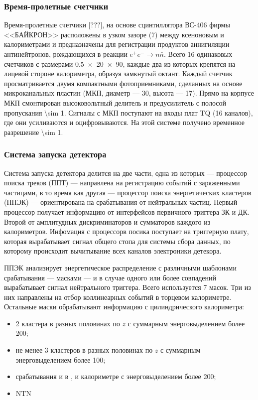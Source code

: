 \subsubsection{Время-пролетные счетчики}\label{sec:tof}

Время-пролетные счетчики [???], на основе сцинтиллятора ВС-406 фирмы <<БАЙКРОН>> расположены в
узком зазоре (\SI{7}{\mmr}) между ксеноновым и  калориметрами и предназначены для регистрации продуктов
аннигиляции антинейтронов, рождающихся в реакции $e^+e^- \to n \bar{n}$. 
Всего \num{16} одинаковых счетчиков с размерами \SI[product-units = power]{0.5 x 20 x 90}{\cmr},
каждые два из которых крепятся на лицевой стороне  калориметра,
образуя замкнутый октант.
Каждый счетчик просматривается двумя компактными фотоприемниками,
сделанных на основе микроканальных пластин
(МКП, диаметр --- \SI{30}{\mmr}, высота --- \SI{17}{\mmr}). 
Прямо на корпусе МКП смонтирован высоковольтный делитель и предусилитель с полосой пропускания \SI{\sim 1}{\GHzr}. 
Сигналы с МКП поступают на входы плат TQ (\num{16} каналов),
где они усиливаются и оцифровываются. 
На этой системе получено временное разрешение \SI{\sim 1}{\nsr}.




\subsubsection{Система запуска детектора}\label{sec:trigger}

Система запуска детектора делится на две части,
одна из которых --- процессор поиска треков (ППТ) --- направлена на регистрацию событий с заряженными частицами,
в то время как другая --- процессор поиска энергетических кластеров (ППЭК) --- ориентирована на срабатывания от нейтральных частиц.
Первый процессор получает информацию от интерфейсов первичного триггера ЗК и ДК.
Второй от амплитудных дискриминаторов и сумматоров каждого из калориметров.
Инфомация с процессорв посика поступает на триггерную плату,
которая вырабатывает сигнал общего стопа для системы сбора данных,
по которому происходит вычитывание всех каналов электроники детекора.

ППЭК анализирует энергетическое распределение с различными шаблонами срабатывания --- масками ---
и в случае одного или более совпадений вырабатывает сигнал нейтрального триггера.
Всего используется 7 масок.
Три из них направлены на отбор коллинеарных событий в торцевом калориметре.
Остальные маски обрабатывают информацию с цилиндрического калориметра:
\begin{itemize}
    \item 2 кластера в разных половинах по $z$ с суммарным энерговыделением более \SI{200}{\MeVr};
    \item не менее 3 кластеров в разных половинах по $z$ с суммарным энерговыделением более \SI{100}{\MeVr};
    \item срабатывания и в , и  калориметре с энерговыделением более \SI{200}{\MeVr};
    \item NTN
\end{itemize}







